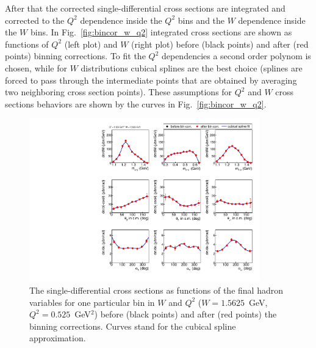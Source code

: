 After that the corrected single-differential cross sections are
integrated and corrected to the $Q^{2}$ dependence
inside the $Q^{2}$ bins and the  $W$ dependence  inside the $W$ bins.
In Fig.~\ref{fig:bincor_w_q2} integrated cross sections are shown as  functions of $Q^{2}$ (left plot) and $W$ (right plot) before (black points) and after (red points) binning corrections. 
To fit the $Q^{2}$ dependencies a second order polynom is chosen, while for $W$ distributions cubical splines  are the best choice (splines are forced to pass through the intermediate points that are obtained by averaging two neighboring cross section points).
These assumptions for $Q^{2}$ and $W$ cross sections behaviors are shown by the curves in Fig.~\ref{fig:bincor_w_q2}. 

\begin{figure}[htp]
\begin{center}
\includegraphics[width=10cm]{pictures/bin_corr/bin_corr_1d.pdf}
\caption{\small The single-differential cross sections as functions of the final hadron variables for one particular bin in $W$ and $Q^{2}$ ($W = 1.5625$~GeV, $Q^{2} = 0.525$~GeV$^{2}$) before  (black points) and after (red points) the binning corrections. Curves stand for the cubical spline approximation.} \label{fig:bincor_1d}
\end{center}
\end{figure}

